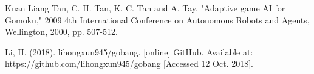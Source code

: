 \documentclass[conference,compsoc]{IEEEtran}
\begin{document}



%
%
\begin{thebibliography}{1}
Kuan Liang Tan, C. H. Tan, K. C. Tan and A. Tay, "Adaptive game AI for Gomoku," 2009 4th International Conference on Autonomous Robots and Agents, Wellington, 2000, pp. 507-512.

Li, H. (2018). lihongxun945/gobang. [online] GitHub. Available at: https://github.com/lihongxun945/gobang [Accessed 12 Oct. 2018].
\end{thebibliography}





\end{document}
